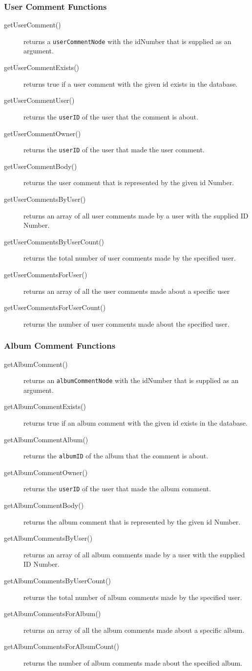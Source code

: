 \documentclass{article}
\begin{document}
\subsubsection{User Comment Functions}
\begin{description}
\item[getUserComment()] returns a \verb|userCommentNode| with the idNumber that is supplied as an argument. 
\item[getUserCommentExists()] returns true if a user comment with the given id exists in the database.
\item[getUserCommentUser()] returns the \verb|userID| of the user that the comment is about.
\item[getUserCommentOwner()] returns the \verb|userID| of the user that made the user comment.
\item[getUserCommentBody()] returns the  user comment that is represented by the given id Number.
\item[getUserCommentsByUser()] returns an array of all user comments made by a user with the supplied ID Number.
\item[getUserCommentsByUserCount()] returns the total number of user comments made by the specified user.
\item[getUserCommentsForUser()] returns an array of all the user comments made about a specific user
\item[getUserCommentsForUserCount()] returns the number of user comments made about the specified user.
\end{description}

\subsubsection{Album Comment Functions}
\begin{description}
\item[getAlbumComment()] returns an \verb|albumCommentNode| with the idNumber that is supplied as an argument. 
\item[getAlbumCommentExists()] returns true if an album comment with the given id exists in the database.
\item[getAlbumCommentAlbum()] returns the \verb|albumID| of the album that the comment is about.
\item[getAlbumCommentOwner()] returns the \verb|userID| of the user that made the album comment.
\item[getAlbumCommentBody()] returns the  album comment that is represented by the given id Number.
\item[getAlbumCommentsByUser()] returns an array of all album comments made by a user with the supplied ID Number.
\item[getAlbumCommentsByUserCount()] returns the total number of album comments made by the specified user.
\item[getAlbumCommentsForAlbum()] returns an array of all the album comments made about a specific album.
\item[getAlbumCommentsForAlbumCount()] returns the number of album comments made about the specified album.
\end{description}
\end{document}
